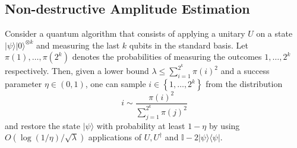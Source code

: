 	\subsection{Non-destructive Amplitude Estimation}
\begin{lemma}
	 Consider a quantum algorithm that consists of applying a unitary $U$ on a state $|\psi\rangle|0\rangle^{\otimes k}$ and measuring the last $k$ qubits in the standard basis. Let $\pi(1), \ldots, \pi\left(2^k\right)$ denotes the probabilities of measuring the outcomes $1, \ldots, 2^k$ respectively. Then, given a lower bound $\lambda \leq \sum_{i=1}^{2^k} \pi(i)^2$ and a success parameter $\eta \in(0,1)$, one can sample $i \in\left\{1, \ldots, 2^k\right\}$ from the distribution
	$$
	i \sim \frac{\pi(i)^2}{\sum_{j=1}^{2^k} \pi(j)^2}
	$$
	and restore the state $|\psi\rangle$ with probability at least $1-\eta$ by using $O(\log (1 / \eta) / \sqrt{\lambda})$ applications of $U, U^{\dagger}$ and $\mathbb{I}-2|\psi\rangle\langle\psi|$.
\end{lemma}
